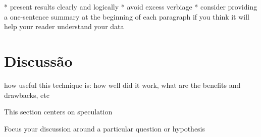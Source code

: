 \documentclass{article}
\begin{document}
  * present results clearly and logically
  * avoid excess verbiage
  * consider providing a one-sentence summary at the beginning of each paragraph if you think it will help your reader understand your data 

\section{Discussão} %

how useful this technique is: how well did it work, what are the benefits and drawbacks, etc

This section centers on speculation

Focus your discussion around a particular question or hypothesis



\end{document}
